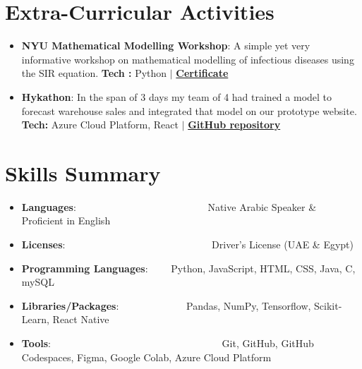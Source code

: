 \documentclass[a4paper,30pt]{article}
\newcommand{\resumeItem}[2] {
	\item\small{
		\textbf{#1}{: #2 \vspace{-2pt}}
	}
}
\newcommand{\resumeSubItem}[2]{\resumeItem{#1}{#2}\vspace{-3pt}}
\newcommand{\resumeSubHeadingListStart}{\begin{itemize}[leftmargin=*]}
\newcommand{\resumeSubHeadingListEnd}{\end{itemize}}
\begin{document}
\section{Extra-Curricular Activities}
	\resumeSubHeadingListStart
        \resumeSubItem{NYU Mathematical Modelling Workshop}{ A simple yet very informative workshop on mathematical modelling of infectious diseases using the SIR equation. \textbf{Tech : } Python $\vert$
        \href{https://github.com/asa30/My-Certificates/blob/main/NYU-Mathematical\%20Modeling\%20Workshop\%20on\%20the\%202nd\%20-\%20Ahmed\%20Sherif\%20Abdelfattah.pdf}{\textbf{Certificate}}
        }
		\resumeSubItem{Hykathon}{ In the span of 3 days my team of 4 had trained a model to forecast warehouse sales and integrated that model on our prototype website.  \textbf{Tech:} Azure Cloud Platform, React $\vert$ \href{https://github.com/AhmedElZubair38/Hykathon}{\textbf{GitHub repository}}}
	\resumeSubHeadingListEnd
	\vspace{-5pt}

\section{Skills Summary}
	\resumeSubHeadingListStart
        \resumeSubItem{Languages}{~~~~~~~~~~~~~~~~~~~~~~~~~~Native Arabic Speaker \& Proficient in English}
		\resumeSubItem{Licenses}{~~~~~~~~~~~~~~~~~~~~~~~~~~~~~Driver's License (UAE \& Egypt) }
		\resumeSubItem{Programming Languages}{~~~~Python, JavaScript, HTML, CSS, Java, C, mySQL}
        \resumeSubItem{Libraries/Packages}{~~~~~~~~~~~~~Pandas, NumPy, Tensorflow, Scikit-Learn, React Native}
		\resumeSubItem{Tools}{~~~~~~~~~~~~~~~~~~~~~~~~~~~~~~~~~~Git, GitHub, GitHub Codespaces, Figma, Google Colab, Azure Cloud Platform}
	\resumeSubHeadingListEnd

\end{document}
